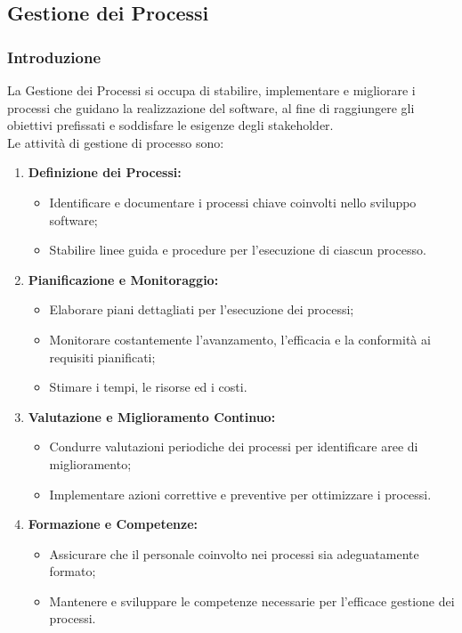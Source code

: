 \subsection{Gestione dei Processi}

\subsubsection{Introduzione}
La Gestione dei Processi si occupa di stabilire, implementare e migliorare i processi che guidano la realizzazione del software, al fine di raggiungere gli obiettivi prefissati e soddisfare le esigenze degli stakeholder.
\\
Le attività di gestione di processo sono:
\begin{enumerate}
    \item \textbf{Definizione dei Processi:}
      \begin{itemize}
        \item Identificare e documentare i processi chiave coinvolti nello sviluppo software;
        \item Stabilire linee guida e procedure per l'esecuzione di ciascun processo.
      \end{itemize}
  
    \item \textbf{Pianificazione e Monitoraggio:}
      \begin{itemize}
        \item Elaborare piani dettagliati per l'esecuzione dei processi;
        \item Monitorare costantemente l'avanzamento, l'efficacia e la conformità ai requisiti pianificati;
        \item Stimare i tempi, le risorse ed i costi.
      \end{itemize}
  
    \item \textbf{Valutazione e Miglioramento Continuo:}
      \begin{itemize}
        \item Condurre valutazioni periodiche dei processi per identificare aree di miglioramento;
        \item Implementare azioni correttive e preventive per ottimizzare i processi.
      \end{itemize}
  
    \item \textbf{Formazione e Competenze:}
      \begin{itemize}
        \item Assicurare che il personale coinvolto nei processi sia adeguatamente formato;
        \item Mantenere e sviluppare le competenze necessarie per l'efficace gestione dei processi.
      \end{itemize}
  

\end{enumerate}
